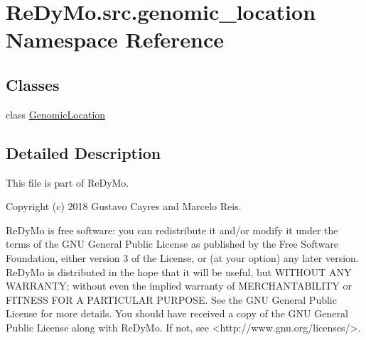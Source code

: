 \hypertarget{namespaceReDyMo_1_1src_1_1genomic__location}{}\section{Re\+Dy\+Mo.\+src.\+genomic\+\_\+location Namespace Reference}
\label{namespaceReDyMo_1_1src_1_1genomic__location}
\subsection*{Classes}
\begin{DoxyCompactItemize}
\item 
class \mbox{\hyperlink{classReDyMo_1_1src_1_1genomic__location_1_1GenomicLocation}{Genomic\+Location}}
\end{DoxyCompactItemize}


\subsection{Detailed Description}
\begin{DoxyVerb}This file is part of ReDyMo.

    Copyright (c) 2018  Gustavo Cayres and Marcelo Reis.

    ReDyMo is free software: you can redistribute it and/or modify it
    under the terms of the GNU General Public License as published by the
    Free Software Foundation, either version 3 of the License, or (at your
    option) any later version.
    ReDyMo is distributed in the hope that it will be useful, but WITHOUT
    ANY WARRANTY; without even the implied warranty of MERCHANTABILITY or
    FITNESS FOR A PARTICULAR PURPOSE. See the GNU General Public License
    for more details.
    You should have received a copy of the GNU General Public License along
    with ReDyMo. If not, see <http://www.gnu.org/licenses/>.\end{DoxyVerb}
 